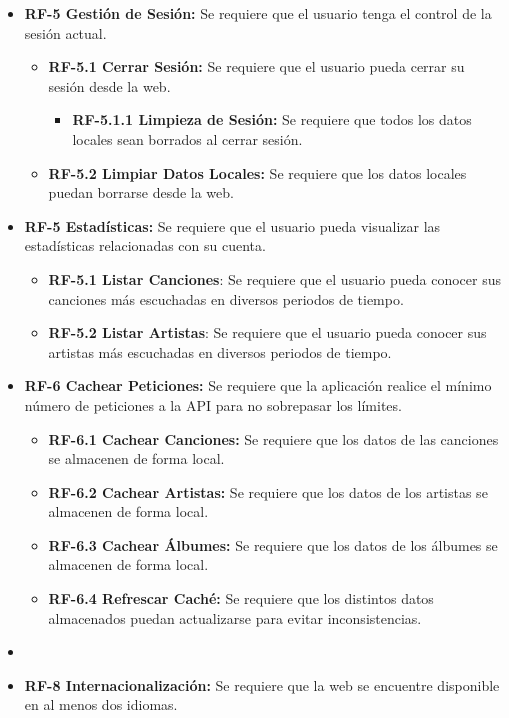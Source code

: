 \begin{itemize}
    \item
        \textbf{RF-5 Gestión de Sesión:} Se requiere que el usuario tenga el control de la sesión actual.
        \begin{itemize}
            \item
                \textbf{RF-5.1 Cerrar Sesión:} Se requiere que el usuario pueda cerrar su sesión desde la web.
                \begin{itemize}
                    \item
                    \textbf{RF-5.1.1 Limpieza de Sesión:} Se requiere que todos los datos locales sean borrados al cerrar sesión.
                \end{itemize}
            \item
                \textbf{RF-5.2 Limpiar Datos Locales:} Se requiere que los datos locales puedan borrarse desde la web.
        \end{itemize}
    
    \item
        \textbf{RF-5 Estadísticas:} Se requiere que el usuario pueda visualizar las estadísticas relacionadas con su cuenta.
        \begin{itemize}
            \item \textbf{RF-5.1 Listar Canciones}: Se requiere que el usuario pueda conocer sus canciones más escuchadas en diversos periodos de tiempo.
            \item \textbf{RF-5.2 Listar Artistas}: Se requiere que el usuario pueda conocer sus artistas más escuchadas en diversos periodos de tiempo.
        \end{itemize}
    
    \item
        \textbf{RF-6 Cachear Peticiones:} Se requiere que la aplicación realice el mínimo número de peticiones a la API para no sobrepasar los límites.
            \begin{itemize}
                \item \textbf{RF-6.1 Cachear Canciones:} Se requiere que los datos de las canciones se almacenen de forma local.
                \item \textbf{RF-6.2 Cachear Artistas:} Se requiere que los datos de los artistas se almacenen de forma local.
                \item \textbf{RF-6.3 Cachear Álbumes:} Se requiere que los datos de los álbumes se almacenen de forma local.
                \item \textbf{RF-6.4 Refrescar Caché:} Se requiere que los distintos datos almacenados puedan actualizarse para evitar inconsistencias.
            \end{itemize}
    \item
    \item
        \textbf{RF-8 Internacionalización:} Se requiere que la web se encuentre disponible en al menos dos idiomas.
    
\end{itemize}

